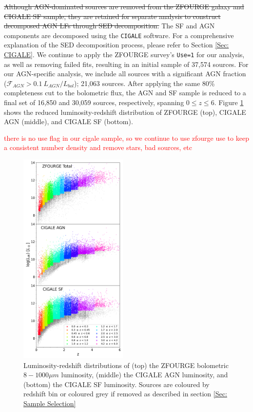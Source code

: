 \sout{Although AGN-dominated sources are removed from the ZFOURGE galaxy and CIGALE SF sample, they are retained for separate analysis to construct decomposed AGN LFs through SED decomposition.} The SF and AGN components are decomposed using the \texttt{CIGALE} software. For a comprehensive explanation of the SED decomposition process, please refer to Section \ref{Sec: CIGALE}. We continue to apply the ZFOURGE survey's \texttt{Use=1} for our analysis, as well as removing failed fits, resulting in an initial sample of 37,574 sources. For our AGN-specific analysis, we include all sources with a significant AGN fraction ($\mathcal{F}_{AGN}>0.1\ L_{AGN}/L_{bol}$); 21,063 sources. After applying the same 80\% completeness cut to the bolometric flux, the AGN and SF sample is reduced to a final set of 16,850 and 30,059 sources, respectively, spanning $0 \leq z \leq 6$. Figure \ref{Fig: ZF Lum vs z} shows the reduced luminosity-redshift distribution of ZFOURGE (top), CIGALE AGN (middle), and CIGALE SF (bottom).

\textcolor{red}{there is no use flag in our cigale sample, so we continue to use zfourge use to keep a consistent number density and remove stars, bad sources, etc}

\begin{figure}
    \centering
    \includegraphics[width=0.48\textwidth]{Figures/LIR_vs_Z.png}
    \caption{Luminosity-redshift distributions of (top) the ZFOURGE bolometric $8-1000\mu m$ luminosity, (middle) the CIGALE AGN luminosity, and (bottom) the CIGALE SF luminosity. Sources are coloured by redshift bin or coloured grey if removed as described in section \ref{Sec: Sample Selection}}
    \label{Fig: ZF Lum vs z}
\end{figure}


